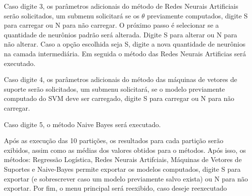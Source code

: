 Caso digite 3, os parâmetros adicionais do método de Redes Neurais Artificiais serão solicitados, um submenu solicitará se os \(\theta\) previamente computados, digite S para carregar ou N para não carregar. O próximo passo é selecionar se a quantidade de neurônios padrão será alterada. Digite S para alterar ou N para não alterar. Caso a opção escolhida seja S, digite a nova quantidade de neurônios na camada intermediária.
Em seguida o método das Redes Neurais Artificias será executado.

Caso digite 4, os parâmetros adicionais do método das máquinas de vetores de suporte serão solicitados, um submenu solicitará, se o modelo previamente computado do SVM deve ser carregado, digite S para carregar ou N para não carregar.

Caso digite 5, o método Naive Bayes será executado.

Após as execução das 10 partições, os resultados para cada partição serão exibidos, assim como as médias dos valores obtidos para o métodos. Após isso, os métodos: Regressão Logística, Redes Neurais Artifciais, Máquinas de Vetores de Suportes e Naive-Bayes permite exportar os modelos computados, digite S para exportar (e sobrescrever caso um modelo previamente salvo exista) ou N para não exportar. Por fim, o menu principal será reexibido, caso deseje reexecutado


